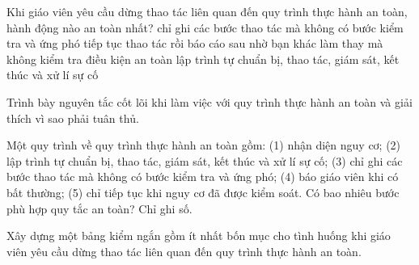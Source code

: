 \begin{ex}
Khi giáo viên yêu cầu dừng thao tác liên quan đến quy trình thực hành an toàn, hành động nào an toàn nhất?
\choice
{chỉ ghi các bước thao tác mà không có bước kiểm tra và ứng phó}
{tiếp tục thao tác rồi báo cáo sau}
{nhờ bạn khác làm thay mà không kiểm tra điều kiện an toàn}
{\True lập trình tự chuẩn bị, thao tác, giám sát, kết thúc và xử lí sự cố}
\end{ex}

\begin{bt}
Trình bày nguyên tắc cốt lõi khi làm việc với quy trình thực hành an toàn và giải thích vì sao phải tuân thủ.
\end{bt}

\begin{ex}
Một quy trình về quy trình thực hành an toàn gồm: (1) nhận diện nguy cơ; (2) lập trình tự chuẩn bị, thao tác, giám sát, kết thúc và xử lí sự cố; (3) chỉ ghi các bước thao tác mà không có bước kiểm tra và ứng phó; (4) báo giáo viên khi có bất thường; (5) chỉ tiếp tục khi nguy cơ đã được kiểm soát. Có bao nhiêu bước phù hợp quy tắc an toàn? Chỉ ghi số.
\end{ex}

\begin{bt}
Xây dựng một bảng kiểm ngắn gồm ít nhất bốn mục cho tình huống khi giáo viên yêu cầu dừng thao tác liên quan đến quy trình thực hành an toàn.
\end{bt}

